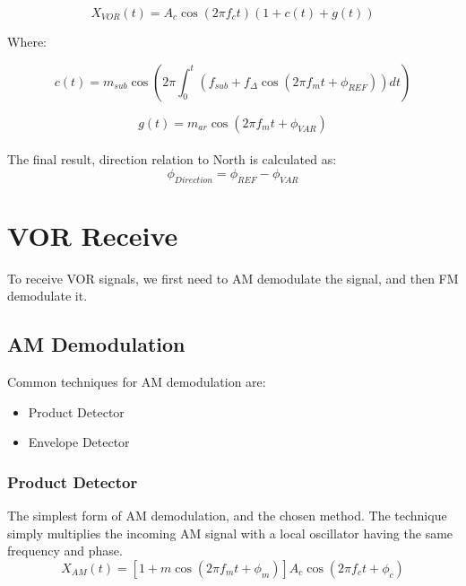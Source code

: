 \documentclass[12pt]{article}
\begin{document}
\begin{equation}
\label{VOR signal}
X_{VOR}(t) = A_c \cos (2 \pi f_c t)(1 + c(t) + g(t))
\end{equation}

Where:

\begin{equation}\label{c(t)}
c(t) = m_{sub} \cos (2 \pi \int_{0}^{t}\left(f_{sub} + f_\Delta \cos(2 \pi f_m t + \phi_{REF})\right)dt) 
\end{equation}

\begin{equation}
\label{g(t)}
g(t) = m_{ar} \cos (2 \pi f_m t + \phi_{VAR})
\end{equation} %
\\
The final result, direction relation to North is calculated as:
\begin{equation}
\label{phase compare}
\phi_{Direction} = \phi_{REF}-\phi_{VAR}
\end{equation}

\section{VOR Receive}%
To receive VOR signals, we first need to AM demodulate the signal, and then FM demodulate it.
\subsection{AM Demodulation}%
Common techniques for AM demodulation are:
\begin{itemize}
    \item Product Detector
    \item Envelope Detector
\end{itemize}
\subsubsection{Product Detector}
The simplest form of AM demodulation, and the chosen method. The technique simply multiplies the incoming AM signal with a local oscillator having the same frequency and phase.
\begin{equation}
\label{demodulator section AM modulation equation}
X_{AM}(t) = [1 + m\cos(2\pi f_m t + \phi_m)]A_c\cos(2\pi f_c t + \phi_c)
\end{equation}
\end{document}
